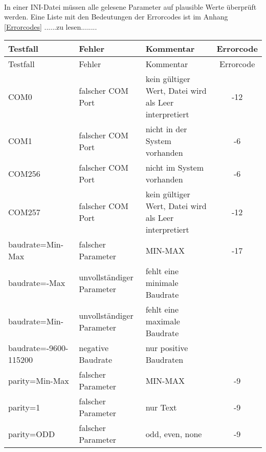 \paragraph{}
In einer INI-Datei müssen alle gelesene Parameter auf plausible Werte überprüft werden. Eine Liste mit den Bedeutungen der Errorcodes ist im Anhang \ref{Errorcodes} ......zu lesen........
\begin{longtable}{||l|p{3cm}|p{5cm}|c||}
 


\hline
Testfall & Fehler & Kommentar & Errorcode \\ \hline\hline
\endfirsthead
\hline
Testfall & Fehler & Kommentar & Errorcode \\ \hline\hline
\endhead

COM0   & falscher COM Port & kein gültiger Wert, Datei wird als Leer interpretiert & -12\\ \hline
COM1   & falscher COM Port & nicht in der System vorhanden                         & -6 \\ \hline
COM256 & falscher COM Port & nicht im System vorhanden                             & -6 \\ \hline
COM257 & falscher COM Port & kein gültiger Wert, Datei wird als Leer interpretiert & -12\\ \hline\hline

baudrate=Min-Max     & falscher Parameter      & MIN-MAX                      & -17 \\ \hline
baudrate=-Max        & unvollständiger Parameter & fehlt eine minimale Baudrate &  \\ \hline
baudrate=Min-        & unvollständiger Parameter & fehlt eine maximale Baudrate &  \\ \hline
baudrate=-9600-115200& negative Baudrate         & nur positive Baudraten       &  \\ \hline

parity=Min-Max & falscher Parameter & MIN-MAX         & -9\\ \hline
parity=1       & falscher Parameter & nur Text & -9\\ \hline
parity=ODD     & falscher Parameter & odd, even, none & -9\\ \hline\hline


\end{longtable}
